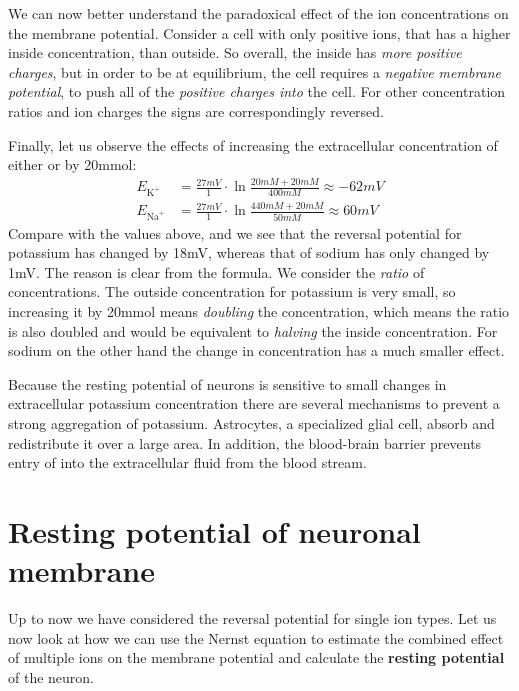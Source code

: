 We can now better understand the paradoxical effect of the ion concentrations on the membrane potential. Consider a cell with only positive ions, that has a higher inside concentration, than outside. So overall, the inside has \textit{more positive charges}, but in order to be at equilibrium, the cell requires a \textit{negative membrane potential}, to push all of the \textit{positive charges into} the cell. For other concentration ratios and ion charges the signs are correspondingly reversed.

Finally, let us observe the effects of increasing the extracellular concentration of either  or  by 20\si{\milli\mole}:
\begin{align*}
E_{\text{K}^+}&=\frac{27 \si{mV}}{1} \cdot \ln \frac{20 \si{mM} + 20 \si{mM}}{400 \si{mM}} \approx -62 \si{mV}\\
E_{\text{Na}^+}&=\frac{27 \si{mV}}{1} \cdot \ln \frac{440 \si{mM} + 20 \si{mM}}{50 \si{mM}} \approx 60 \si{mV}
\end{align*}
Compare with the values above, and we see that the reversal potential for potassium has changed by 18\si{mV}, whereas that of sodium has only changed by 1\si{mV}. The reason is clear from the formula. We consider the \textit{ratio} of concentrations. The outside concentration for potassium is very small, so increasing it by 20\si{\milli\mole} means \textit{doubling} the concentration, which means the ratio is also doubled and would be equivalent to \textit{halving} the inside concentration. For sodium on the other hand the change in concentration has a much smaller effect.

Because the resting potential of neurons is sensitive to small changes in extracellular potassium concentration there are several mechanisms to prevent a strong aggregation of potassium. Astrocytes, a specialized glial cell, absorb  and redistribute it over a large area. In addition, the blood-brain barrier prevents entry of  into the extracellular fluid from the blood stream.

\section{Resting potential of neuronal membrane}

Up to now we have considered the reversal potential for single ion types. Let us now look at how we can use the Nernst equation to estimate the combined effect of multiple ions on the membrane potential and calculate the \textbf{resting potential} of the neuron.

